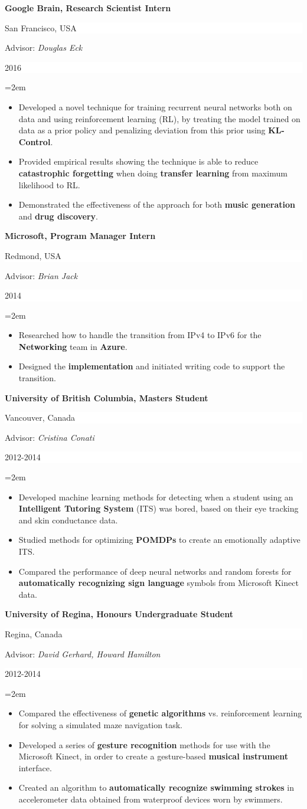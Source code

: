 \documentclass[paper=letter,fontsize=11pt]{scrartcl} %
\newcommand{\sepspace}{\vspace*{1em}}       %
\newcommand{\ResearchEntry}[5]{
        \noindent \textbf{#1} \hfill      %
        \colorbox{White}{%
            \parbox{10em}{%
            \hfill\color{Black}#2}} \par  %
        \noindent Advisor: \textit{#3} \hfill      %
        \colorbox{White}{%
            \parbox{6em}{%
            \hfill\color{Black}#4}} \par  %
        \noindent\hangindent=2em\hangafter=0 \small #5 %
        \normalsize \par}
\begin{document}
\ResearchEntry{Google Brain, Research Scientist Intern}{San Francisco, USA}{Douglas Eck}{2016}
{\begin{itemize}
    \item Developed a novel technique for training recurrent neural networks both on data and using reinforcement learning (RL), by treating the model trained on data as a prior policy and penalizing deviation from this prior using \textbf{KL-Control}.
    \item Provided empirical results showing the technique is able to reduce \textbf{catastrophic forgetting} when doing \textbf{transfer learning} from maximum likelihood to RL. 
    \item Demonstrated the effectiveness of the approach for both \textbf{music generation} and \textbf{drug discovery}.
\end{itemize}}
\sepspace

\ResearchEntry{Microsoft, Program Manager Intern}{Redmond, USA}{Brian Jack}{2014}
{\begin{itemize}
    \item Researched how to handle the transition from IPv4 to IPv6 for the \textbf{Networking} team in \textbf{Azure}.
    \item Designed the \textbf{implementation} and initiated writing code to support the transition.
\end{itemize}}
\sepspace

\ResearchEntry{University of British Columbia, Masters Student}{Vancouver, Canada}{Cristina Conati}{2012-2014}
{\begin{itemize}
    \item Developed machine learning methods for detecting when a student using an \textbf{Intelligent Tutoring System} (ITS) was bored, based on their eye tracking and skin conductance data.
    \item Studied methods for optimizing \textbf{POMDPs} to create an emotionally adaptive ITS. 
    \item Compared the performance of deep neural networks and random forests for \textbf{automatically recognizing sign language} symbols from Microsoft Kinect data. 
\end{itemize}}
\sepspace

\ResearchEntry{University of Regina, Honours Undergraduate Student}{Regina, Canada}{David Gerhard, Howard Hamilton}{2012-2014}
{\begin{itemize}
    \item Compared the effectiveness of \textbf{genetic algorithms} vs. reinforcement learning for solving a simulated maze navigation task. 
    \item Developed a series of \textbf{gesture recognition} methods for use with the Microsoft Kinect, in order to create a gesture-based \textbf{musical instrument} interface.
    \item Created an algorithm to \textbf{automatically recognize swimming strokes} in accelerometer data obtained from waterproof devices worn by swimmers.
\end{itemize}}
\sepspace
\end{document}
